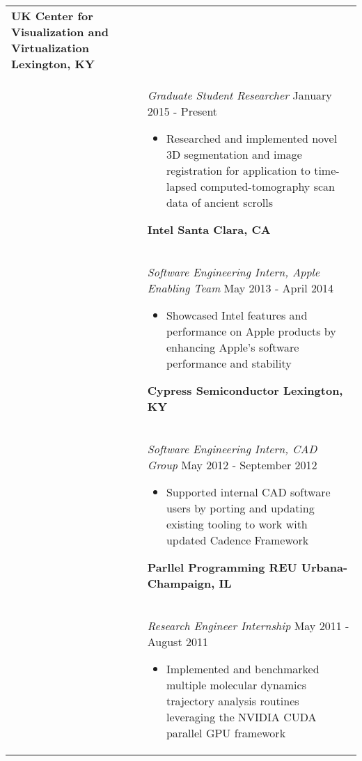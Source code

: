 \documentclass[11pt]{article}
\begin{document}
\begin{tabular}{p{0.75in} p{5.45in}}
        \textbf{UK Center for Visualization and Virtualization \hfill Lexington, KY} \vspace{0.015in} \\ &
        {\textit{Graduate Student Researcher} \hfill January 2015 - Present} \vspace{0.02in}
        \begin{itemize}
            \renewcommand{\labelitemi}{$\diamond$}
            \item Researched and implemented novel 3D segmentation and image registration for application to time-lapsed computed-tomography scan data of ancient scrolls
        \end{itemize} \vspace{0.09in}

        \textbf{Intel \hfill Santa Clara, CA} \vspace{0.015in} \\ &
        {\textit{Software Engineering Intern, Apple Enabling Team} \hfill May 2013 - April 2014} \vspace{0.02in}
        \begin{itemize}
            \renewcommand{\labelitemi}{$\diamond$}
            \item Showcased Intel features and performance on Apple products by enhancing Apple's software performance and stability
        \end{itemize} \vspace{0.09in}

        \textbf{Cypress Semiconductor \hfill Lexington, KY} \vspace{0.015in} \\ &
        {\textit{Software Engineering Intern, CAD Group} \hfill May 2012 - September 2012} \vspace{0.02in}
        \begin{itemize}
            \renewcommand{\labelitemi}{$\diamond$}
            \item Supported internal CAD software users by porting and updating existing tooling to work with updated Cadence Framework
        \end{itemize} \vspace{0.09in}

        \textbf{Parllel Programming REU \hfill Urbana-Champaign, IL} \vspace{0.015in} \\ &
        {\textit{Research Engineer Internship} \hfill May 2011 - August 2011} \vspace{0.02in}
        \begin{itemize}
            \renewcommand{\labelitemi}{$\diamond$}
            \item Implemented and benchmarked multiple molecular dynamics trajectory analysis routines leveraging the NVIDIA CUDA parallel GPU framework 
        \end{itemize} \\


\end{tabular}
\end{document}

